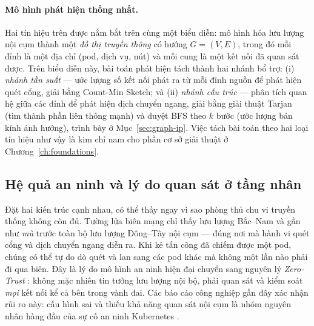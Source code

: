 \paragraph{Mô hình phát hiện thống nhất.} Hai tín hiệu trên được nắm bắt trên cùng một
biểu diễn: mô hình hóa lưu lượng nội cụm thành một \emph{đồ thị truyền thông} có hướng
$G=(V,E)$, trong đó mỗi đỉnh là một địa chỉ (pod, dịch vụ, nút) và mỗi cung là một kết nối
đã quan sát được. Trên biểu diễn này, bài toán phát hiện tách thành hai nhánh bổ trợ:
(i) \emph{nhánh tần suất} --- ước lượng số kết nối phát ra từ mỗi đỉnh nguồn để phát hiện
quét cổng, giải bằng Count-Min Sketch; và (ii) \emph{nhánh cấu trúc} --- phân tích quan hệ
giữa các đỉnh để phát hiện dịch chuyển ngang, giải bằng giải thuật Tarjan (tìm thành phần
liên thông mạnh) và duyệt BFS theo $k$ bước (ước lượng bán kính ảnh hưởng), trình bày ở
Mục~\ref{sec:graph-ip}. Việc tách bài toán theo hai loại tín hiệu như vậy là kim chỉ nam cho phần cơ sở giải thuật ở Chương~\ref{ch:foundations}.

\subsection{Hệ quả an ninh và lý do quan sát ở tầng nhân}
\label{subsec:why-kernel}

Đặt hai kiến trúc cạnh nhau, có thể thấy ngay vì sao phòng thủ chu vi truyền thống không
còn đủ. Tường lửa biên mạng chỉ thấy lưu lượng Bắc--Nam và gần như \emph{mù} trước toàn bộ
lưu lượng Đông--Tây nội cụm --- đúng nơi mà hành vi quét cổng và dịch chuyển ngang diễn ra.
Khi kẻ tấn công đã chiếm được một pod, chúng có thể tự do dò quét và lan sang các pod khác
mà không một lần nào phải đi qua biên. Đây là lý do mô hình an ninh hiện đại chuyển sang
nguyên lý \emph{Zero-Trust} \cite{nist800207}: không mặc nhiên tin tưởng lưu lượng nội bộ,
phải quan sát và kiểm soát \emph{mọi} kết nối kể cả bên trong vành đai. Các báo cáo công
nghiệp gần đây xác nhận rủi ro này: cấu hình sai và thiếu khả năng quan sát nội cụm là
nhóm nguyên nhân hàng đầu của sự cố an ninh Kubernetes
\cite{redhat2024k8ssec,wiz2025k8ssec,pereiravale2021security}.

